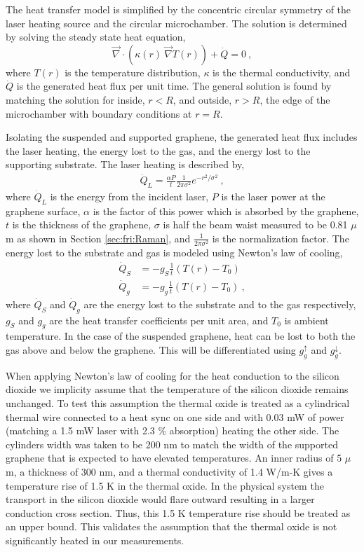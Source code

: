 The heat transfer model is simplified by the concentric circular symmetry of the laser heating source and the circular microchamber.
The solution is determined by solving the steady state heat equation,
\begin{equation*}
	\vec{\nabla} \cdot \left(\kappa(r) \ \vec{\nabla} T(r) \right) + \dot{Q}=0 \ ,
	\label{eq:therm:heateq}
\end{equation*}
where $T(r)$ is the temperature distribution, $\kappa$ is the thermal conductivity, and $\dot{Q}$ is the generated heat flux per unit time.
The general solution is found by matching the solution for inside, $r<R$, and outside, $r>R$, the edge of the microchamber with boundary conditions at $r=R$.

Isolating the suspended and supported graphene, the generated heat flux includes the laser heating, the energy lost to the gas, and the energy lost to the supporting substrate.
The laser heating is described by,
\begin{align}
	\dot{Q}_{L}=\frac{\alpha P}{t} \frac{1}{2 \pi \sigma^2} e^{-r^2/\sigma^2} \ ,
\end{align}
where $\dot{Q}_L$ is the energy from the incident laser, $P$ is the laser power at the graphene surface, $\alpha$ is the factor of this power which is absorbed by the graphene, $t$ is the thickness of the graphene, $\sigma$ is half the beam waist measured to be 0.81 $\mu$m as shown in Section \ref{sec:fri:Raman}, and $\frac{1}{2 \pi \sigma^2}$ is the normalization factor.
The energy lost to the substrate and gas is modeled using Newton's law of cooling,
\begin{align*}
	\dot{Q}_{S}&=-g_S \frac{1}{t} \left(T(r)-T_0 \right) \\
	\dot{Q}_{g}&=-g_g \frac{1}{t} \left(T(r)-T_0 \right) \ ,
\end{align*}
where $\dot{Q}_{S}$ and $\dot{Q}_g$ are the energy lost to the substrate and to the gas respectively, $g_S$ and $g_g$ are the heat transfer coefficients per unit area, and $T_0$ is ambient temperature.
In the case of the suspended graphene, heat can be lost to both the gas above and below the graphene.
This will be differentiated using $g_g^{\uparrow}$ and $g_g^{\downarrow}$.

When applying Newton's law of cooling for the heat conduction to the silicon dioxide we implicity assume that the temperature of the silicon dioxide remains unchanged.
To test this assumption the thermal oxide is treated as a cylindrical thermal wire connected to a heat sync on one side and with 0.03 mW of power (matching a 1.5 mW laser with 2.3 \% absorption) heating the other side.
The cylinders width was taken to be 200 nm to match the width of the supported graphene that is expected to have elevated temperatures.
An inner radius of 5 $\mu$m, a thickness of 300 nm, and a thermal conductivity of 1.4 W/m-K \cite{} gives a temperature rise of 1.5 K in the thermal oxide.
In the physical system the transport in the silicon dioxide would flare outward resulting in a larger conduction cross section.
Thus, this 1.5 K temperature rise should be treated as an upper bound.
This validates the assumption that the thermal oxide is not significantly heated in our measurements.

